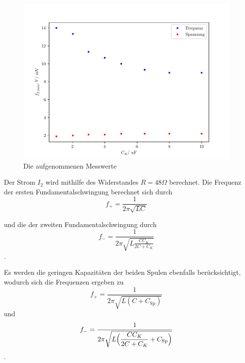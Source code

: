 \begin{figure}
  \centering
  \includegraphics{freq2.pdf}
  \caption{Die aufgenommenen Messwerte}
  \label{fig:freq2}
\end{figure}


Der Strom $I_2$ wird mithilfe des Widerstandes $R=48\Omega$ berechnet.
Die Frequenz der ersten Fundamentalschwingung berechnet sich durch %
\begin{equation}
  f_+ = \frac{1}{2\pi\sqrt{LC}}
\end{equation}

und die der zweiten Fundamentalschwingung durch 
\begin{equation}
  f_- = \frac{1}{2\pi\sqrt{L\frac{CC_K}{2C+C_K}}} 
\end{equation}.

Es werden die geringen Kapazitäten der beiden Spulen ebenfalls berücksichtigt, wodurch sich die Frequenzen ergeben zu \newline
\begin{equation}
  f_+ = \frac{1}{2\pi\sqrt{L(C + C_\text{Sp})}}
\end{equation} 
und \newline 
\begin{equation}
  f_- = \frac{1}{2\pi\sqrt{L\Bigl(\dfrac{CC_K}{2C+C_K} + C_\text{Sp}\Bigr)}}
\end{equation}.  


